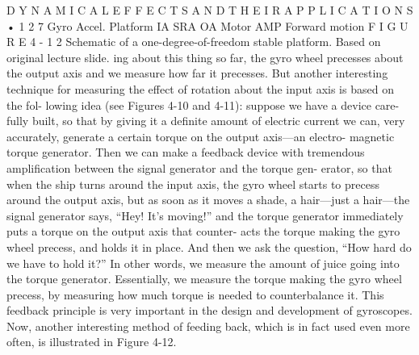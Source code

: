 \documentclass[10pt,oneside]{article}
\begin{document}
D Y N A M I C A L  E F F E C T S  A N D  T H E I R  A P P L I C A T I O N S • 1 2 7 Gyro Accel. Platform IA SRA OA Motor AMP Forward motion F I G U R E  4 - 1 2 Schematic of a one-degree-of-freedom stable platform. Based on original lecture slide. ing about this thing so far, the gyro wheel precesses about the output axis and we measure how far it precesses. But another interesting technique for measuring the effect of rotation about the input axis is based on the fol- lowing idea (see Figures 4-10 and 4-11): suppose we have a device care- fully built, so that by giving it a definite amount of electric current we can, very accurately, generate a certain torque on the output axis---an electro- magnetic torque generator. Then we can make a feedback device with tremendous amplification between the signal generator and the torque gen- erator, so that when the ship turns around the input axis, the gyro wheel starts to precess around the output axis, but as soon as it moves a shade, a hair---just a hair---the signal generator says, “Hey! It’s moving!” and the torque generator immediately puts a torque on the output axis that counter- acts the torque making the gyro wheel precess, and holds it in place. And then we ask the question, “How hard do we have to hold it?” In other words, we measure the amount of juice going into the torque generator. Essentially, we measure the torque making the gyro wheel precess, by measuring how much torque is needed to counterbalance it. This feedback principle is very important in the design and development of gyroscopes. Now, another interesting method of feeding back, which is in fact used even more often, is illustrated in Figure 4-12.\par
\end{document}
